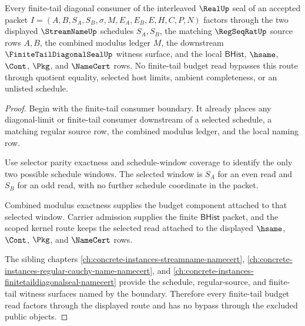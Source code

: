 \begin{theorem}
\label{thm:regular-cauchy-interleaving-finite-tail-budget-route}
Every finite-tail diagonal consumer of the interleaved $\RealUp$ seal of an accepted packet $I=(A,B,S_A,S_B,\sigma,M,E_A,E_B,E,H,C,P,N)$ factors through the two displayed $\StreamNameUp$ schedules $S_A,S_B$, the matching $\RegSeqRatUp$ source rows $A,B$, the combined modulus ledger $M$, the downstream $\FiniteTailDiagonalSealUp$ witness surface, and the local $\mathsf{BHist}$, $\hsame$, $\Cont$, $\Pkg$, and $\NameCert$ rows. No finite-tail budget read bypasses this route through quotient equality, selected host limits, ambient completeness, or an unlisted schedule.
\end{theorem}
\begin{proof}
Begin with the finite-tail consumer boundary. It already places any diagonal-limit or finite-tail consumer downstream of a selected schedule, a matching regular source row, the combined modulus ledger, and the local naming row.

Use selector parity exactness and schedule-window coverage to identify the only two possible schedule windows. The selected window is $S_A$ for an even read and $S_B$ for an odd read, with no further schedule coordinate in the packet.

Combined modulus exactness supplies the budget component attached to that selected window. Carrier admission supplies the finite $\mathsf{BHist}$ packet, and the scoped kernel route keeps the selected read attached to the displayed $\hsame$, $\Cont$, $\Pkg$, and $\NameCert$ rows.

The sibling chapters \autoref{ch:concrete-instances-streamname-namecert}, \autoref{ch:concrete-instances-regular-cauchy-name-namecert}, and \autoref{ch:concrete-instances-finitetaildiagonalseal-namecert} provide the schedule, regular-source, and finite-tail witness surfaces named by the boundary. Therefore every finite-tail budget read factors through the displayed route and has no bypass through the excluded public objects.
\end{proof}

